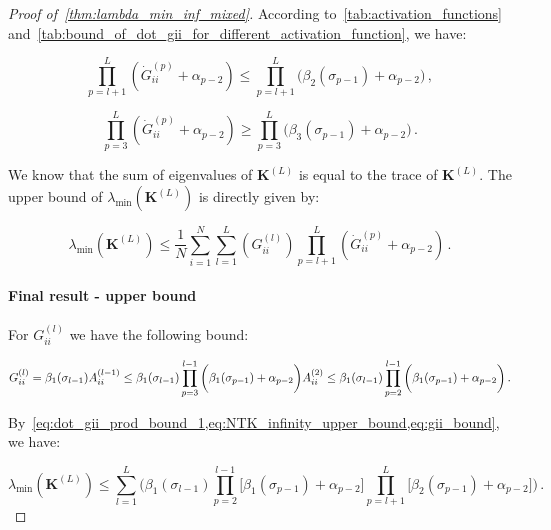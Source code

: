 \documentclass[nohyperref]{article}
\theoremstyle{plain}
\theoremstyle{definition}
\theoremstyle{remark}
\begin{document}
\begin{proof}[Proof of~\cref{thm:lambda_min_inf_mixed}]
According to~\cref{tab:activation_functions} and~\cref{tab:bound_of_dot_gii_for_different_activation_function}, we have:

\begin{equation}
\prod_{p=l+1}^{L}(\dot{G}^{(p)}_{ii}+\alpha_{p-2}) \leq \prod_{p=l+1}^{L}\bigg(\beta_2(\sigma_{p-1})+\alpha_{p-2}\bigg)\,,
\label{eq:dot_gii_prod_bound_1}
\end{equation}

\begin{equation}
\prod_{p=3}^{L}(\dot{G}^{(p)}_{ii}+\alpha_{p-2}) \geq \prod_{p=3}^{L}\bigg(\beta_3(\sigma_{p-1})+\alpha_{p-2}\bigg)\,.
\label{eq:dot_gii_prod_bound_2}
\end{equation}

We know that the sum of eigenvalues of $\bm{K}^{(L)}$ is equal to the trace of $\bm{K}^{(L)}$. The upper bound of $\lambda _{\min}(\bm{K}^{(L)})$ is directly given by:

\begin{equation}
\lambda _{\min}(\bm{K}^{(L)}) \leq \frac{1}{N} \sum_{i=1}^{N} \sum_{l=1}^{L}(G^{(l)}_{ii})\prod_{p=l+1}^{L}(\dot{G}^{(p)}_{ii}+\alpha_{p-2})\,.
\label{eq:NTK_infinity_upper_bound}
\end{equation}


\paragraph{Final result - upper bound\\}

For $G^{(l)}_{ii}$ we have the following bound:

\begin{equation}
\small
G^{(l)}_{ii} = \beta_1(\sigma_{l-1}) A^{(l-1)}_{ii} \leq \beta_1(\sigma_{l-1}) \prod_{p=3}^{l-1} \bigg(\beta_1(\sigma_{p-1})+\alpha_{p-2}\bigg) A^{(2)}_{ii}\leq \beta_1(\sigma_{l-1}) \prod_{p=2}^{l-1} \bigg(\beta_1(\sigma_{p-1})+\alpha_{p-2}\bigg)\,.
\label{eq:gii_bound}
\end{equation}

By~\cref{eq:dot_gii_prod_bound_1,eq:NTK_infinity_upper_bound,eq:gii_bound}, we have:


\begin{equation}
\lambda _{\min}(\bm{K}^{(L)})\leq \sum_{l=1}^{L}\bigg(\beta_1(\sigma_{l-1}) \prod_{p=2}^{l-1} \bigg[\beta_1(\sigma_{p-1})+\alpha_{p-2}\bigg]\prod_{p=l+1}^{L}\bigg[\beta_2(\sigma_{p-1})+\alpha_{p-2}\bigg]\bigg)\,.
\label{eq:NTK_infinity_upper_bound_final}
\end{equation}


\end{proof}
\end{document}
